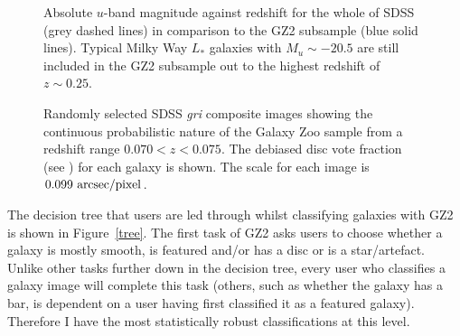 \begin{figure}
\caption[GZ2-GALEX sample completeness]{Absolute $u$-band magnitude against redshift for the whole of SDSS (grey dashed lines) in comparison to the GZ2 subsample (blue solid lines). Typical Milky Way $L_*$ galaxies with $M_u \sim -20.5$ are still included in the GZ2 subsample out to the highest redshift of $z \sim 0.25$.}
\label{complete}
\end{figure}

\begin{figure}
\caption[Example SDSS images with GZ2 vote fractions]{Randomly selected SDSS \emph{gri} composite images showing the continuous probabilistic nature of the Galaxy Zoo sample from a redshift range $0.070 < z < 0.075$. The debiased disc vote fraction (see \citealt{GZ2}) for each galaxy is shown. The scale for each image is $0.099~\rm{arcsec/pixel}$.}
\label{mosaic}
\end{figure}


The decision tree that users are led through whilst classifying galaxies with GZ2 is shown in Figure~\ref{tree}. The first task of GZ2 asks users to choose whether a galaxy is mostly smooth, is featured and/or has a disc or is a star/artefact. Unlike other tasks further down in the decision tree, every user who classifies a galaxy image will complete this task (others, such as whether the galaxy has a bar, is dependent on a user having first classified it as a featured galaxy). Therefore I have the most statistically robust classifications at this level.

